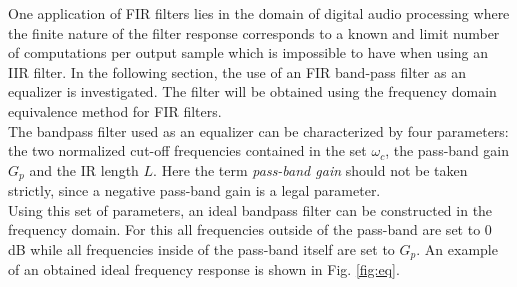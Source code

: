 \documentclass[journal]{IEEEtran}
\begin{document}
One application of FIR filters lies in the domain of digital audio processing where the finite nature of the filter response corresponds to a known and limit number of computations per output sample which is impossible to have when using an IIR filter. In the following section, the use of an FIR band-pass filter as an equalizer is investigated. The filter will be obtained using the frequency domain equivalence method for FIR filters. \\
\newline
The bandpass filter used as an equalizer can be characterized by four parameters: the two normalized cut-off frequencies contained in the set $\omega_c$, the pass-band gain $G_p$ and the IR length $L$. Here the term \textit{pass-band gain} should not be taken strictly, since a negative pass-band gain is a legal parameter. \\
\newline
Using this set of parameters, an ideal bandpass filter can be constructed in the frequency domain. For this all frequencies outside of the pass-band are set to 0 dB while all frequencies inside of the pass-band itself are set to $G_p$. An example of an obtained ideal frequency response is shown in Fig. \ref{fig:eq}.
\end{document}
